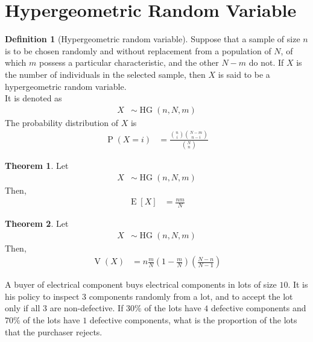 \documentclass[titlepage, fleqn, a4paper, 12pt, twoside]{article}
\theoremstyle{definition}
\newtheorem{definition}{Definition}
\theoremstyle{theorem}
\newtheorem{theorem}{Theorem}
\DeclareMathOperator{\prob}{\mathrm{P}}
\DeclareMathOperator{\expct}{\mathrm{E}}
\DeclareMathOperator{\var}{\mathrm{V}}
\DeclareMathOperator{\hg}{\mathrm{HG}}
\begin{document}
\section{Hypergeometric Random Variable}

\begin{definition}[Hypergeometric random variable]
	Suppose that a sample of size $n$ is to be chosen randomly and without replacement from a population of $N$, of which $m$ possess a particular characteristic, and the other $N - m$ do not.
	If $X$ is the number of individuals in the selected sample, then $X$ is said to be a hypergeometric random variable.\\
	It is denoted as
	\begin{align*}
		X & \sim \hg(n,N,m)
	\end{align*}
	The probability distribution of $X$ is
	\begin{align*}
		\prob(X = i) & = \frac{\binom{n}{i} \binom{N - m}{n - i}}{\binom{N}{n}}
	\end{align*}
\end{definition}

\begin{theorem}
	Let
	\begin{align*}
		X & \sim \hg(n,N,m)
	\end{align*}
	Then,
	\begin{align*}
		\expct[X] & = \frac{n m}{N}
	\end{align*}
\end{theorem}

\begin{theorem}
	Let
	\begin{align*}
		X & \sim \hg(n,N,m)
	\end{align*}
	Then,
	\begin{align*}
		\var(X) & = n \frac{m}{N} \left( 1 - \frac{m}{N} \right) \left( \frac{N - n}{N - 1} \right)
	\end{align*}
\end{theorem}

\begin{question}
	A buyer of electrical component buys electrical components in lots of size $10$.
	It is his policy to inspect $3$ components randomly from a lot, and to accept the lot only if all $3$ are non-defective.
	If $30\%$ of the lots have $4$ defective components and $70\%$ of the lots have $1$ defective components, what is the proportion of the lots that the purchaser rejects.
\end{question}
\end{document}

